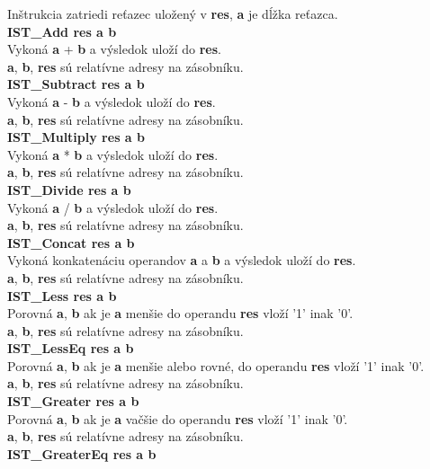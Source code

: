 \documentclass[12pt,a4paper,titlepage,final]{article}
\begin{document}
Inštrukcia zatriedi reťazec uložený v \textbf{res}, \textbf{a} je dĺžka reťazca.\\
\textbf{IST\_Add res a b}\\
Vykoná \textbf{a} + \textbf{b} a výsledok uloží do \textbf{res}.\\
\textbf{a}, \textbf{b}, \textbf{res} sú relatívne adresy na zásobníku.\\
\textbf{IST\_Subtract res a b}\\
Vykoná \textbf{a} - \textbf{b} a výsledok uloží do \textbf{res}.\\
\textbf{a}, \textbf{b}, \textbf{res} sú relatívne adresy na zásobníku.\\
\textbf{IST\_Multiply res a b}\\
Vykoná \textbf{a} * \textbf{b} a výsledok uloží do \textbf{res}.\\
\textbf{a}, \textbf{b}, \textbf{res} sú relatívne adresy na zásobníku.\\
\textbf{IST\_Divide res a b}\\
Vykoná \textbf{a} / \textbf{b} a výsledok uloží do \textbf{res}.\\
\textbf{a}, \textbf{b}, \textbf{res} sú relatívne adresy na zásobníku.\\
\textbf{IST\_Concat res a b}\\
Vykoná konkatenáciu operandov \textbf{a} a \textbf{b} a výsledok uloží do \textbf{res}.\\
\textbf{a}, \textbf{b}, \textbf{res} sú relatívne adresy na zásobníku.\\
\textbf{IST\_Less res a b}\\
Porovná \textbf{a}, \textbf{b} ak je \textbf{a} menšie do operandu \textbf{res} vloží '1' inak '0'.\\
\textbf{a}, \textbf{b}, \textbf{res} sú relatívne adresy na zásobníku.\\
\textbf{IST\_LessEq res a b}\\
Porovná \textbf{a}, \textbf{b} ak je \textbf{a} menšie alebo rovné, do operandu \textbf{res} vloží '1' inak '0'.\\
\textbf{a}, \textbf{b}, \textbf{res} sú relatívne adresy na zásobníku.\\
\textbf{IST\_Greater res a b}\\
Porovná \textbf{a}, \textbf{b} ak je \textbf{a} vačšie do operandu \textbf{res} vloží '1' inak '0'.\\
\textbf{a}, \textbf{b}, \textbf{res} sú relatívne adresy na zásobníku.\\
\textbf{IST\_GreaterEq res a b}\\
\end{document}
